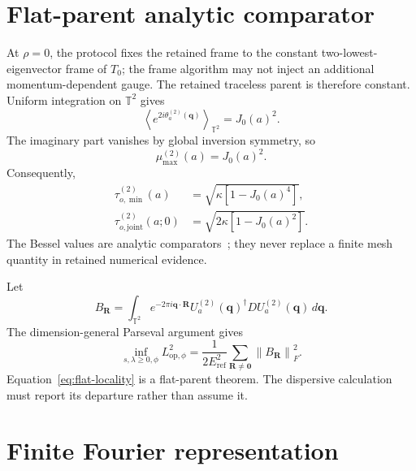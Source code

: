 \documentclass[11pt]{article}
\newcommand{\norm}[1]{\left\lVert #1\right\rVert}
\newcommand{\T}{\mathbb T}
\begin{document}
\section{Flat-parent analytic comparator}

At $\rho=0$, the protocol fixes the retained frame to the constant two-lowest-eigenvector
frame of $T_0$; the frame algorithm may not inject an additional momentum-dependent
gauge. The retained traceless parent is therefore constant. Uniform integration on $\T^2$
gives
\begin{equation}
 \left\langle e^{2i\theta_a^{(2)}(\mathbf q)}\right\rangle_{\T^2}
 =J_0(a)^2.
\end{equation}
The imaginary part vanishes by global inversion symmetry, so
\begin{equation}
 \mu_{\max}^{(2)}(a)=J_0(a)^2.
 \label{eq:flat-correlation}
\end{equation}
Consequently,
\begin{align}
 \tau_{o,\min}^{(2)}(a)
 &=\sqrt{\kappa\left[1-J_0(a)^4\right]},\\
 \tau_{o,\mathrm{joint}}^{(2)}(a;0)
 &=\sqrt{2\kappa\left[1-J_0(a)^2\right]}.
\end{align}
The Bessel values are analytic comparators~\cite{dlmf1012}; they never replace a finite
mesh quantity in retained numerical evidence.

Let
\begin{equation}
 B_{\mathbf R}=
 \int_{\T^2}e^{-2\pi i\mathbf q\cdot\mathbf R}
 U_a^{(2)}(\mathbf q)^\dagger D U_a^{(2)}(\mathbf q)\,d\mathbf q.
\end{equation}
The dimension-general Parseval argument gives
\begin{equation}
 \inf_{s,\lambda\ge0,\phi}L_{\mathrm{op},\phi}^2
 =\frac{1}{2E_{\mathrm{ref}}^2}
  \sum_{\mathbf R\ne\mathbf0}\norm{B_{\mathbf R}}_F^2.
 \label{eq:flat-locality}
\end{equation}
Equation~\eqref{eq:flat-locality} is a flat-parent theorem. The dispersive calculation
must report its departure rather than assume it.

\section{Finite Fourier representation}
\end{document}
